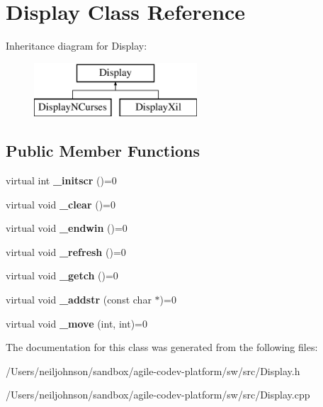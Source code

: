 \hypertarget{class_display}{\section{Display Class Reference}
\label{class_display}
}
Inheritance diagram for Display\+:\begin{figure}[H]
\begin{center}
\leavevmode
\includegraphics[height=2.000000cm]{class_display}
\end{center}
\end{figure}
\subsection*{Public Member Functions}
\begin{DoxyCompactItemize}
\item 
\hypertarget{class_display_a752a3b427cc86ef1afc35660e1083f61}{virtual int {\bfseries \+\_\+initscr} ()=0}\label{class_display_a752a3b427cc86ef1afc35660e1083f61}

\item 
\hypertarget{class_display_a8bd839f831135920320ec9df15dff4ea}{virtual void {\bfseries \+\_\+clear} ()=0}\label{class_display_a8bd839f831135920320ec9df15dff4ea}

\item 
\hypertarget{class_display_a8677bab55262fea0da3b7e10fa239eeb}{virtual void {\bfseries \+\_\+endwin} ()=0}\label{class_display_a8677bab55262fea0da3b7e10fa239eeb}

\item 
\hypertarget{class_display_a3af3e58e999e7a4bbe8747fef6a88c71}{virtual void {\bfseries \+\_\+refresh} ()=0}\label{class_display_a3af3e58e999e7a4bbe8747fef6a88c71}

\item 
\hypertarget{class_display_a5d6b10e388794156595f493f383a7068}{virtual void {\bfseries \+\_\+getch} ()=0}\label{class_display_a5d6b10e388794156595f493f383a7068}

\item 
\hypertarget{class_display_a5a9b0330abede469d35e294e5d5f5389}{virtual void {\bfseries \+\_\+addstr} (const char $\ast$)=0}\label{class_display_a5a9b0330abede469d35e294e5d5f5389}

\item 
\hypertarget{class_display_a6c5faed34fe0b7e386db82180134ff4f}{virtual void {\bfseries \+\_\+move} (int, int)=0}\label{class_display_a6c5faed34fe0b7e386db82180134ff4f}

\end{DoxyCompactItemize}


The documentation for this class was generated from the following files\+:\begin{DoxyCompactItemize}
\item 
/\+Users/neiljohnson/sandbox/agile-\/codev-\/platform/sw/src/Display.\+h\item 
/\+Users/neiljohnson/sandbox/agile-\/codev-\/platform/sw/src/Display.\+cpp\end{DoxyCompactItemize}
